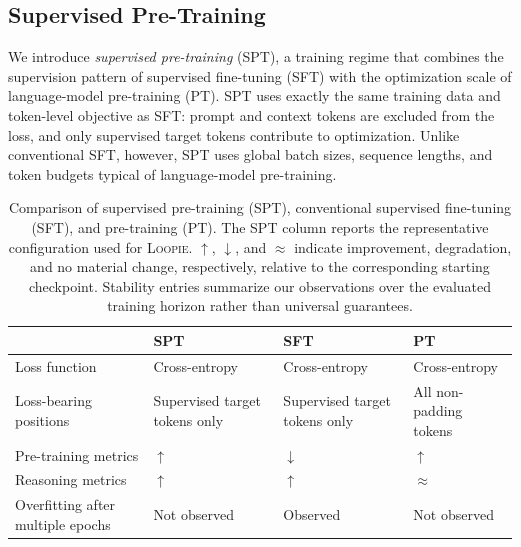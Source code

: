 \subsection{Supervised Pre-Training}
\label{sec:spt}

We introduce \emph{supervised pre-training} (SPT), a training
regime that combines the supervision pattern of supervised fine-tuning
(SFT) with the optimization scale of language-model pre-training (PT).
SPT uses exactly the same training data and token-level objective as
SFT: prompt and context tokens are excluded from the loss, and only
supervised target tokens contribute to optimization. Unlike conventional
SFT, however, SPT uses global batch sizes, sequence lengths, and token
budgets typical of language-model pre-training.

\begin{table}[H]
\centering
\caption{
Comparison of supervised pre-training (SPT), conventional supervised
fine-tuning (SFT), and pre-training (PT). The SPT column reports the
representative configuration used for \textsc{Loopie}.
$\uparrow$, $\downarrow$, and $\approx$ indicate improvement,
degradation, and no material change, respectively, relative to the
corresponding starting checkpoint. Stability entries summarize our
observations over the evaluated training horizon rather than universal
guarantees.
}
\label{tab:spt-comparison}
\small
\setlength{\tabcolsep}{5pt}
\renewcommand{\arraystretch}{1.16}
\begin{tabularx}{
    \textwidth
}{
    @{}
    >{\raggedright\arraybackslash}p{}
    >{\centering\arraybackslash}X
    >{\centering\arraybackslash}X
    >{\centering\arraybackslash}X
    @{}
}
\toprule
&
\textbf{SPT}
&
\textbf{SFT}
&
\textbf{PT}
\\
\midrule

Loss function
&
Cross-entropy
&
Cross-entropy
&
Cross-entropy
\\

Loss-bearing positions
&
Supervised target tokens only
&
Supervised target tokens only
&
All non-padding tokens
\\

Pre-training metrics
&
$\uparrow$
&
$\downarrow$
&
$\uparrow$
\\

Reasoning metrics
&
$\uparrow$
&
$\uparrow$
&
$\approx$
\\

Overfitting after multiple epochs
&
Not observed
&
Observed
&
Not observed
\\


\end{tabularx}
\end{table}
